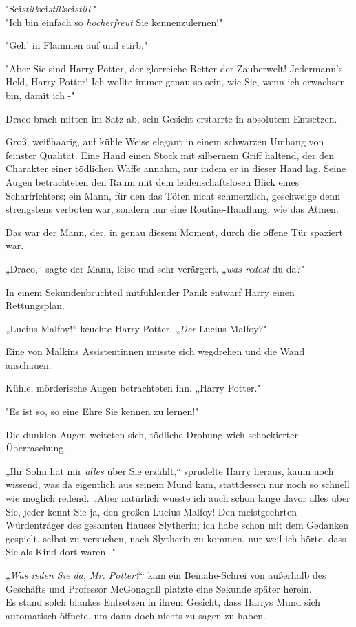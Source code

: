 {"Sei\emph{still}sei\emph{still}sei\emph{still.}"\\ "Ich bin einfach so \emph{hocherfreut} Sie kennenzulernen!"

"Geh' in Flammen auf und stirb."

"Aber Sie sind Harry Potter, der glorreiche Retter der Zauberwelt! Jedermann's Held, Harry Potter! Ich wollte immer genau so sein, wie Sie, wenn ich erwachsen bin, damit ich -"

Draco brach mitten im Satz ab, sein Gesicht erstarrte in absolutem Entsetzen.

Groß, weißhaarig, auf kühle Weise elegant in einem schwarzen Umhang von feinster Qualität. Eine Hand einen Stock mit silbernem Griff haltend, der den Charakter einer tödlichen Waffe annahm, nur indem er in dieser Hand lag. Seine Augen betrachteten den Raum mit dem leidenschaftslosen Blick eines Scharfrichters; ein Mann, für den das Töten nicht schmerzlich, geschweige denn strengstens verboten war, sondern nur eine Routine-Handlung, wie das Atmen.

Das war der Mann, der, in genau diesem Moment, durch die offene Tür spaziert war.

„Draco,“ sagte der Mann, leise und sehr verärgert, „\emph{was redest} du da?"

In einem Sekundenbruchteil mitfühlender Panik entwarf Harry einen Rettungsplan.

„Lucius Malfoy!“ keuchte Harry Potter. „\emph{Der} Lucius Malfoy?"

Eine von Malkins Assistentinnen musste sich wegdrehen und die Wand anschauen.

Kühle, mörderische Augen betrachteten ihn. „Harry Potter."

"Es ist so, so eine Ehre Sie kennen zu lernen!"

Die dunklen Augen weiteten sich, tödliche Drohung wich schockierter Überraschung.

„Ihr Sohn hat mir \emph{alles} über Sie erzählt,“ sprudelte Harry heraus, kaum noch wissend, was da eigentlich aus seinem Mund kam, stattdessen nur noch so schnell wie möglich redend. „Aber natürlich wusste ich auch schon lange davor alles über Sie, jeder kennt Sie ja, den großen Lucius Malfoy! Den meistgeehrten Würdenträger des gesamten Hauses Slytherin; ich habe schon mit dem Gedanken gespielt, selbst zu versuchen, nach Slytherin zu kommen, nur weil ich hörte, dass Sie als Kind dort waren -"

„\emph{Was reden Sie da, Mr. Potter?}“ kam ein Beinahe-Schrei von außerhalb des Geschäfts und Professor McGonagall platzte eine Sekunde später herein.\\ Es stand solch blankes Entsetzen in ihrem Gesicht, dass Harrys Mund sich automatisch öffnete, um dann doch nichts zu sagen zu haben.

}
